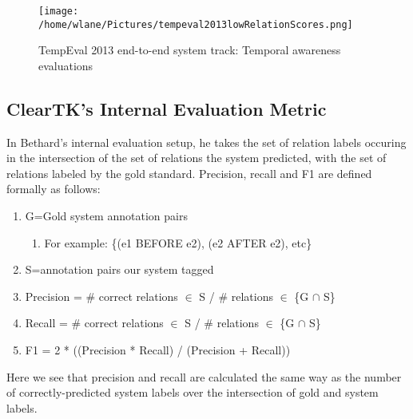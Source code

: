 \documentclass[11pt]{article}
\begin{document}
\begin{figure}[H]
\centering
\texttt{[image: /home/wlane/Pictures/tempeval2013lowRelationScores.png]}
\caption{TempEval 2013 end-to-end system track: Temporal awareness evaluations}\label{precision and recall}
\end{figure}

\subsection{ClearTK's Internal Evaluation Metric}
In Bethard's internal evaluation setup, he takes the set of relation labels occuring in the intersection of the set of relations the system predicted, with the set of relations labeled by the gold standard. Precision, recall and F1 are defined formally as follows: 
\begin{enumerate}
\item G={Gold system annotation pairs} 
\begin{enumerate}
\item For example: \{(e1 BEFORE e2), (e2 AFTER e2), etc\}
\end{enumerate}
\item S={annotation pairs our system tagged}
\item Precision = \# correct relations $\in$  S / \# relations $\in$  \{G  $\cap$  S\}
\item Recall = \# correct relations $\in$  S / \# relations $\in$  \{G  $\cap$  S\}
\item F1 = 2 * ((Precision * Recall) / (Precision + Recall))
\end{enumerate}
 Here we see that precision and recall are calculated the same way as the number of correctly-predicted system labels over the intersection of gold and system labels.
 
\end{document}
